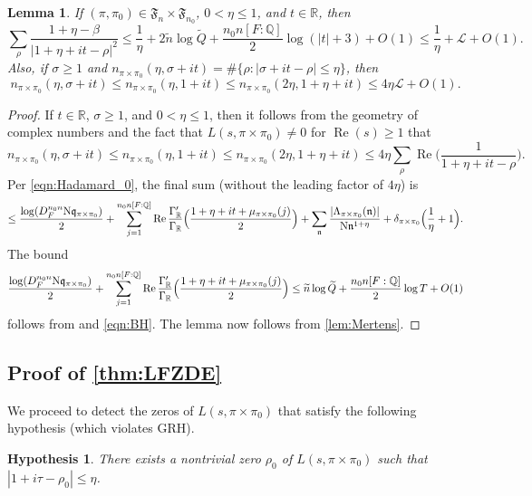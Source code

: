 \documentclass[11pt]{amsart}
\newtheorem{lemma}[theorem]{Lemma}
\newtheorem{hypothesis}[theorem]{Hypothesis}
\theoremstyle{remark}
\numberwithin{equation}{section}
\newcommand{\kn}{\mathfrak{n}}
\newcommand{\kq}{\mathfrak{q}}
\newcommand{\N}{\textnormal{N}}
\newcommand{\R}{\mathbb{R}}
\newcommand{\Q}{\mathbb{Q}}
\renewcommand{\tilde}{\widetilde}
\newcommand{\re}{\mathop{\mathrm{Re}}}
\begin{document}
\begin{lemma}
\label{lem:Linnik_lemma}
If $(\pi,\pi_0)\in\mathfrak{F}_n\times\mathfrak{F}_{n_0}$, $0<\eta\leq 1$, and $t\in\R$, then
\begin{equation}
\label{eqn:Linnik_intermediate}
\sum_{\rho}\frac{1+\eta-\beta}{|1+\eta+it-\rho|^2}\leq \frac{1}{\eta}+2\tilde{n}\log\tilde{Q}+\frac{n_0 n [F:\Q]}{2}\log(|t|+3)+O(1)\leq \frac{1}{\eta}+\mathcal{L}+O(1).
\end{equation}
Also, if $\sigma\geq 1$ and $n_{\pi\times\pi_0}(\eta,\sigma+it)=\#\{\rho\colon |\sigma+it-\rho|\leq\eta\}$, then
\[
n_{\pi\times\pi_0}(\eta,\sigma+it) \leq n_{\pi\times\pi_0}(\eta,1+it)\leq n_{\pi\times\pi_0}(2\eta,1+\eta+it)\leq 4\eta\mathcal{L}+O(1).
\]
\end{lemma}
\begin{proof}
If $t\in\R$, $\sigma\geq 1$, and $0<\eta\leq 1$, then it follows from the geometry of complex numbers and the fact that $L(s,\pi\times\pi_0)\neq 0$ for $\re(s)\geq 1$ that
\[
n_{\pi\times\pi_0}(\eta,\sigma+it)\leq n_{\pi\times\pi_0}(\eta,1+it)\leq n_{\pi\times\pi_0}(2\eta,1+\eta+it)\leq 4\eta\sum_{\rho}\re\Big(\frac{1}{1+\eta+it-\rho}\Big).	
\]
Per \eqref{eqn:Hadamard_0}, the final sum (without the leading factor of $4\eta$) is
\[
\leq \frac{\log(D_F^{n_0 n}\N\kq_{\pi\times\pi_0})}{2}+\sum_{j=1}^{n_0 n [F:\Q]}\re\frac{\Gamma_{\R}'}{\Gamma_{\R}}\Big(\frac{1+\eta+it+\mu_{\pi\times\pi_0}(j)}{2}\Big)+\sum_{\kn}\frac{|\Lambda_{\pi\times\pi_0}(\kn)|}{\N\kn^{1+\eta}}+\delta_{\pi\times\pi_0}\Big(\frac{1}{\eta}+1\Big).
\]
The bound
\[
\frac{\log(D_F^{n_0 n}\N\kq_{\pi\times\pi_0})}{2}+\sum_{j=1}^{n_0 n [F:\Q]}\re\frac{\Gamma_{\R}'}{\Gamma_{\R}}\Big(\frac{1+\eta+it+\mu_{\pi\times\pi_0}(j)}{2}\Big)\leq \tilde{n}\log \tilde{Q}+\frac{n_0 n [F:\Q]}{2}\log T+O(1)
\]
follows from \cite[Lemma, p. 1203]{HIJTS} and \eqref{eqn:BH}.  The lemma now follows from \cref{lem:Mertens}.
\end{proof}

\subsection{Proof of \cref{thm:LFZDE}}



We proceed to detect the zeros of $L(s,\pi\times\pi_0)$ that satisfy the following hypothesis (which violates GRH).

\begin{hypothesis}
	\label{hyp}
There exists a nontrivial zero $\rho_0$ of $L(s,\pi\times\pi_0)$ such that $|1+i\tau-\rho_0|\leq \eta$.
\end{hypothesis}
\end{document}
